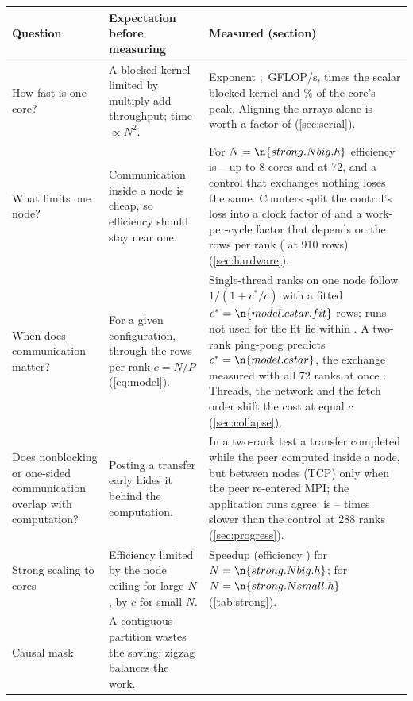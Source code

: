 \begin{table}[!t]
\centering\small
\begin{tabularx}{\textwidth}{@{}p{} Y Y@{}}
\toprule
Question & Expectation before measuring & Measured (section)\\
\midrule
How fast is one core? & A blocked kernel limited by multiply-add throughput; time $\propto N^2$. &
Exponent ; \,GFLOP/s,  times the scalar blocked kernel and \% of the core's peak. Aligning the arrays alone is worth a factor of  (\cref{sec:serial}).\\
What limits one node? & Communication inside a node is cheap, so efficiency should stay near one. &
For $N=\n{strong.Nbig.h}$ efficiency is -- up to 8 cores and  at 72, and a control that exchanges nothing loses the same. Counters split the control's loss into a clock factor of  and a work-per-cycle factor that depends on the rows per rank ( at 910 rows) (\cref{sec:hardware}).\\
When does communication matter? & For a given configuration, through the rows per rank $c=N/P$ (\cref{eq:model}). &
Single-thread ranks on one node follow $1/(1+c^*/c)$ with a fitted $c^*=\n{model.cstar.fit}$ rows; runs not used for the fit lie within . A two-rank ping-pong predicts $c^*=\n{model.cstar}$, the exchange measured with all 72 ranks at once . Threads, the network and the fetch order shift the cost at equal $c$ (\cref{sec:collapse}).\\
Does nonblocking or one-sided communication overlap with computation? & Posting a transfer early hides it behind the computation. &
In a two-rank test a transfer completed while the peer computed inside a node, but between nodes (TCP) only when the peer re-entered MPI; the application runs agree:  is -- times slower than the control at 288 ranks (\cref{sec:progress}).\\
Strong scaling to \MaxCores{} cores & Efficiency limited by the node ceiling for large $N$, by $c$ for small $N$. &
Speedup  (efficiency ) for $N=\n{strong.Nbig.h}$;  for $N=\n{strong.Nsmall.h}$ (\cref{tab:strong}).\\
Causal mask & A contiguous partition wastes the saving; zigzag balances the work. &

\end{tabularx}
\end{table}
